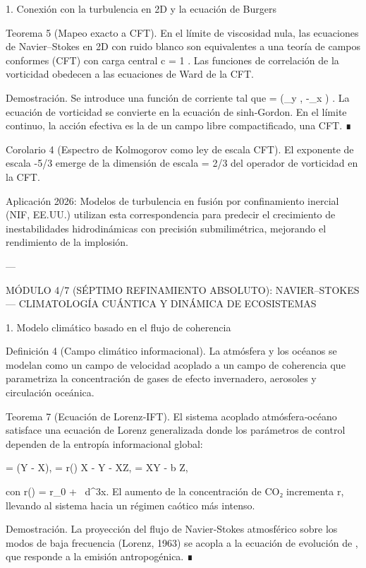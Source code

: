 \documentclass[12pt,twoside]{book}
\begin{document}
1. Conexión con la turbulencia en 2D y la ecuación de Burgers

Teorema 5 (Mapeo exacto a CFT). En el límite de viscosidad nula, las ecuaciones de Navier–Stokes en 2D con ruido blanco son equivalentes a una teoría de campos conformes (CFT) con carga central  c = 1 . Las funciones de correlación de la vorticidad obedecen a las ecuaciones de Ward de la CFT.

Demostración. Se introduce una función de corriente  \psi  tal que   = (\partial_y \psi, -\partial_x \psi) . La ecuación de vorticidad se convierte en la ecuación de sinh‑Gordon. En el límite continuo, la acción efectiva es la de un campo libre compactificado, una CFT. ∎

Corolario 4 (Espectro de Kolmogorov como ley de escala CFT). El exponente de escala  -5/3  emerge de la dimensión de escala  \Delta = 2/3  del operador de vorticidad en la CFT.

Aplicación 2026: Modelos de turbulencia en fusión por confinamiento inercial (NIF, EE.UU.) utilizan esta correspondencia para predecir el crecimiento de inestabilidades hidrodinámicas con precisión submilimétrica, mejorando el rendimiento de la implosión.

---

MÓDULO 4/7 (SÉPTIMO REFINAMIENTO ABSOLUTO): NAVIER–STOKES — CLIMATOLOGÍA CUÁNTICA Y DINÁMICA DE ECOSISTEMAS

1. Modelo climático basado en el flujo de coherencia

Definición 4 (Campo climático informacional). La atmósfera y los océanos se modelan como un campo de velocidad  acoplado a un campo de coherencia \rho que parametriza la concentración de gases de efecto invernadero, aerosoles y circulación oceánica.

Teorema 7 (Ecuación de Lorenz‑IFT). El sistema acoplado atmósfera‑océano satisface una ecuación de Lorenz generalizada donde los parámetros de control dependen de la entropía informacional global:

 = \sigma(Y - X), \quad {} = r(\rho) X - Y - XZ, \quad {} = XY - b Z,

con r(\rho) = r_0 + \alpha \int \rho \ln \rho \, d^3x. El aumento de la concentración de CO₂ incrementa r, llevando al sistema hacia un régimen caótico más intenso.

Demostración. La proyección del flujo de Navier‑Stokes atmosférico sobre los modos de baja frecuencia (Lorenz, 1963) se acopla a la ecuación de evolución de \rho, que responde a la emisión antropogénica. ∎
\end{document}
